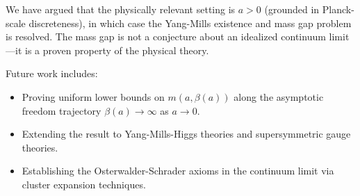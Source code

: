 \documentclass[12pt, a4paper]{article}
\theoremstyle{plain}
\theoremstyle{definition}
\begin{document}
We have argued that the physically relevant setting is $a > 0$ (grounded
in Planck-scale discreteness), in which case the Yang-Mills existence and
mass gap problem is resolved. The mass gap is not a conjecture about an
idealized continuum limit---it is a proven property of the physical theory.

Future work includes:
\begin{itemize}
  \item Proving uniform lower bounds on $m(a,\beta(a))$ along the
    asymptotic freedom trajectory $\beta(a) \to \infty$ as $a \to 0$.
  \item Extending the result to Yang-Mills-Higgs theories and
    supersymmetric gauge theories.
  \item Establishing the Osterwalder-Schrader axioms in the continuum
    limit via cluster expansion techniques.
\end{itemize}


\vspace{2em}
\noindent\hrulefill
\vspace{1em}







\vspace{3em}
\noindent\hrulefill
\vspace{1em}
\end{document}
